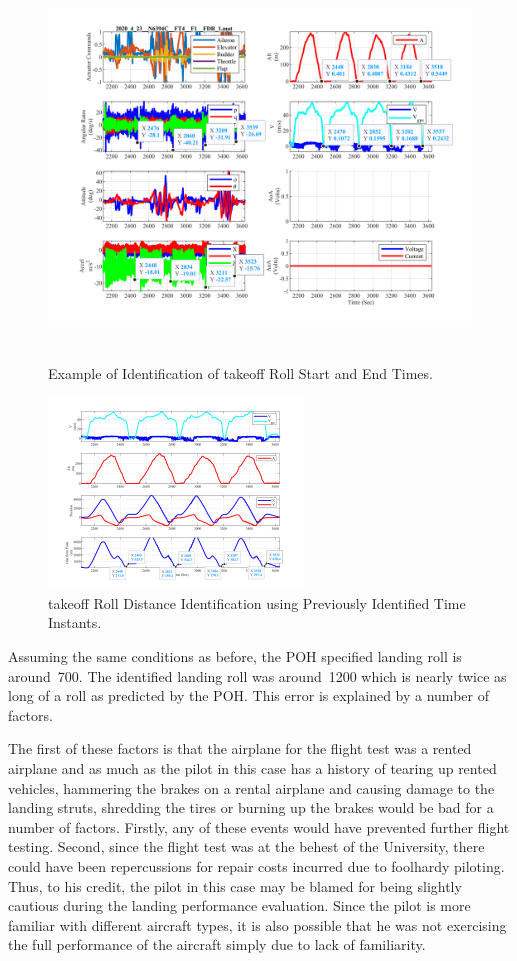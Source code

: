 \documentclass[conf]{new-aiaa}
\begin{document}
\begin{figure}[htp!]
\centering
	\includegraphics[height=4in]{LandingRollTimeID.png}
	\caption{Example of Identification of takeoff Roll Start and End Times.}
	\label{timeid}
\end{figure}

\begin{figure}[htp!]
\centering
	\includegraphics[height=2in]{LandingRollDistID.png}
	\caption{takeoff Roll Distance Identification using Previously Identified Time Instants.}
	\label{distanceid}
\end{figure}

Assuming the same conditions as before, the POH specified landing roll is around~\SI{700}{\foot}.  The identified landing roll was around~\SI{1200}{\foot} which is nearly twice as long of a roll as predicted by the POH. This error is explained by a number of factors.

The first of these factors is that the airplane for the flight test was a rented airplane and as much as the pilot in this case has a history of tearing up rented vehicles, hammering the brakes on a rental airplane and causing damage to the landing struts, shredding the tires or burning up the brakes would be bad for a number of factors. Firstly, any of these events would have prevented further flight testing. Second, since the flight test was at the behest of the University, there could have been repercussions for repair costs incurred due to foolhardy piloting. Thus, to his credit, the pilot in this case may be blamed for being slightly cautious during the landing performance evaluation.  Since the pilot is more familiar with different aircraft types, it is also possible that he was not exercising the full performance of the aircraft simply due to lack of familiarity.
\end{document}
